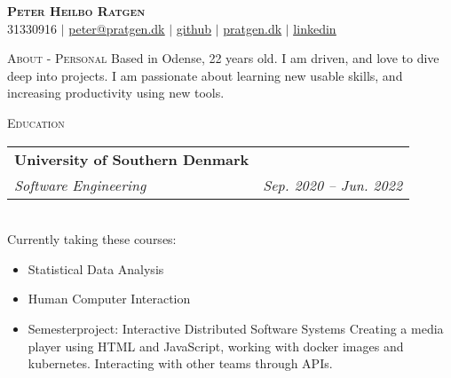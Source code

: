 \documentclass[11pt]{article}
\makeatletter
\newcommand{\resumeSubheading}[4]{
  \noindent\begin{tabular*}{0.98\textwidth}[t]{l@{\extracolsep{\fill}}r}
    \noindent \textbf{#1} & #2 \\ \vspace{-3pt} 
    \noindent \textit{\small#3} & \textit{\small #4} 
  \end{tabular*}\vspace{7pt}
}
\makeatother
\begin{document}
\begin{center}
  \textbf{\huge{\scshape{Peter Heilbo Ratgen}}}\\ 
  \vspace{0.2cm}
  \small 31330916 $|$
  \href{mailto:peter@pratgen.dk}{\underline{peter@pratgen.dk}} $|$
  \href{https://github.com/PeterRatgen }{\underline{github}} $|$
  \href{https://pratgen.dk}{\underline{pratgen.dk}} $|$
  \href{https://www.linkedin.com/in/peter-ratgen-a1236529/}{\underline{linkedin}}
\end{center}

\noindent\large{\scshape{About - Personal}} \newline
\noindent{\rule[0.3cm]{\textwidth}{0.4pt}}
{\normalsize Based in Odense, 22 years old. I am driven, and love to dive deep
  into projects. I am passionate about learning new usable skills, and
  increasing productivity using new tools. 
}

\vspace{0.3cm}
\noindent\large{\scshape{Education}} \newline
\noindent{\rule[0.3cm]{\textwidth}{0.4pt}}

\resumeSubheading{University of Southern Denmark}{}{Software Engineering}{Sep.
2020 -- Jun. 2022}\\\vspace{0.25cm}
{\indent\small Currently taking these courses:}
  \vspace{-0.3cm}
  {\small 
  \begin{itemize}
  \setlength{\itemsep}{-1pt}
    \item Statistical Data Analysis
    \item Human Computer Interaction
    \item Semesterproject: Interactive Distributed Software Systems
      \subitem Creating a media player using HTML and JavaScript, working with
      docker images and kubernetes. Interacting with other teams through APIs.
\end{itemize}} \vspace{0.3cm}
\end{document}
